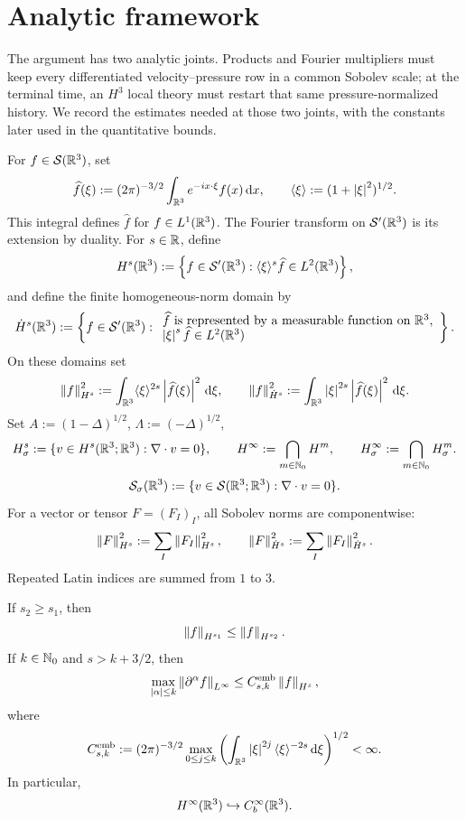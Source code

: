 \section{Analytic framework}

The argument has two analytic joints.  Products and Fourier multipliers must
keep every differentiated velocity--pressure row in a common Sobolev scale;
at the terminal time, an \(H^3\) local theory must restart that same
pressure-normalized history.  We record the estimates needed at those two
joints, with the constants later used in the quantitative bounds.

\begin{definition}
For \(f\in\mathcal S(\mathbb R^3)\), set
\[
 \widehat f(\xi):=(2\pi)^{-3/2}\int_{\mathbb R^3}e^{-ix\cdot\xi}f(x)\,\mathrm d x,
 \qquad
 \langle\xi\rangle:=(1+\left|\xi\right|^2)^{1/2}.
\]
This integral defines \(\widehat f\) for \(f\in L^1(\mathbb R^3)\).  The
Fourier transform on \(\mathcal S'(\mathbb R^3)\) is its extension by duality.
For \(s\in\mathbb R\), define
\[
 H^s(\mathbb R^3):=
 \left\{f\in\mathcal S'(\mathbb R^3):
       \langle\xi\rangle^s\widehat f\in L^2(\mathbb R^3)\right\},
\]
and define the finite homogeneous-norm domain by
\[
 \dot H^s(\mathbb R^3):=
 \left\{f\in\mathcal S'(\mathbb R^3):
 \begin{array}{l}
 \widehat f\text{ is represented by a measurable function on }\mathbb R^3,\\[-2pt]
 \left|\xi\right|^s\widehat f\in L^2(\mathbb R^3)
 \end{array}
 \right\}.
\]
On these domains set
\[
 \left\lVert f\right\rVert_{H^s}^2:=\int_{\mathbb R^3}\langle\xi\rangle^{2s}
 \left|\widehat f(\xi)\right|^2\,\mathrm d\xi,
 \qquad
 \left\lVert f\right\rVert_{\dot H^s}^2:=\int_{\mathbb R^3}\left|\xi\right|^{2s}
 \left|\widehat f(\xi)\right|^2\,\mathrm d\xi.
\]
Set \(A:=(1-\Delta)^{1/2}\), \(\Lambda:=(-\Delta)^{1/2}\),
\[
 H^s_\sigma:=\{v\in H^s(\mathbb R^3;\mathbb R^3):\nabla\cdot v=0\},
 \qquad
 H^\infty:=\bigcap_{m\in\mathbb N_0}H^m,
 \qquad
 H^\infty_\sigma:=\bigcap_{m\in\mathbb N_0}H^m_\sigma.
\]
\[
 \mathcal S_\sigma(\mathbb R^3):=
 \{v\in\mathcal S(\mathbb R^3;\mathbb R^3):\nabla\cdot v=0\}.
\]
For a vector or tensor \(F=(F_I)_I\), all Sobolev norms are componentwise:
\[
 \left\lVert F\right\rVert_{H^s}^2:=\sum_I\left\lVert F_I\right\rVert_{H^s}^2,
 \qquad
 \left\lVert F\right\rVert_{\dot H^s}^2:=\sum_I\left\lVert F_I\right\rVert_{\dot H^s}^2.
\]
Repeated Latin indices are summed from \(1\) to \(3\).
\end{definition}

\begin{lemma}
\label{lem:sobolev-embedding}
If \(s_2\ge s_1\), then
\[
 \left\lVert f\right\rVert_{H^{s_1}}\le\left\lVert f\right\rVert_{H^{s_2}}.
\]
If \(k\in\mathbb N_0\) and \(s>k+3/2\), then
\[
 \max_{\left|\alpha\right|\le k}\left\lVert \partial^\alpha f\right\rVert_{L^\infty}
 \le C_{s,k}^{\rm emb}\left\lVert f\right\rVert_{H^s},
\]
where
\[
 C_{s,k}^{\rm emb}:=(2\pi)^{-3/2}
 \max_{0\le j\le k}
 \left(\int_{\mathbb R^3}\left|\xi\right|^{2j}\langle\xi\rangle^{-2s}\,\mathrm d\xi\right)^{1/2}<\infty.
\]
In particular,
\[
 H^\infty(\mathbb R^3)\hookrightarrow C_b^\infty(\mathbb R^3).
\]
\end{lemma}

